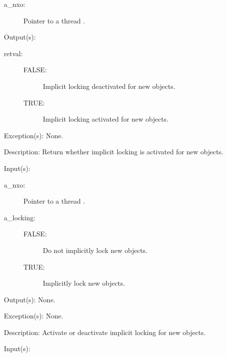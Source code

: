 \begin{capi}
\begin{capilist}
\begin{description}
		\item[a\_nxo: ]
			Pointer to a thread .
		\end{description}
	\item[Output(s): ]
		\begin{description}\item[]
		\item[retval: ]
			\begin{description}\item[]
			\item[FALSE: ]
				Implicit locking deactivated for new objects.
			\item[TRUE: ]
				Implicit locking activated for new objects.
			\end{description}
		\end{description}
	\item[Exception(s): ] None.
	\item[Description: ]
		Return whether implicit locking is activated for new objects.
	\end{capilist}
\label{nxo_thread_setlocking}
	\begin{capilist}
	\item[Input(s): ]
		\begin{description}\item[]
		\item[a\_nxo: ]
			Pointer to a thread .
		\item[a\_locking: ]
			\begin{description}\item[]
			\item[FALSE: ]
				Do not implicitly lock new objects.
			\item[TRUE: ]
				Implicitly lock new objects.
			\end{description}
		\end{description}
	\item[Output(s): ] None.
	\item[Exception(s): ] None.
	\item[Description: ]
		Activate or deactivate implicit locking for new objects.
	\end{capilist}
\label{nxo_thread_nx_get}
	\begin{capilist}
	\item[Input(s): ]

\end{capilist}
\end{capi}
